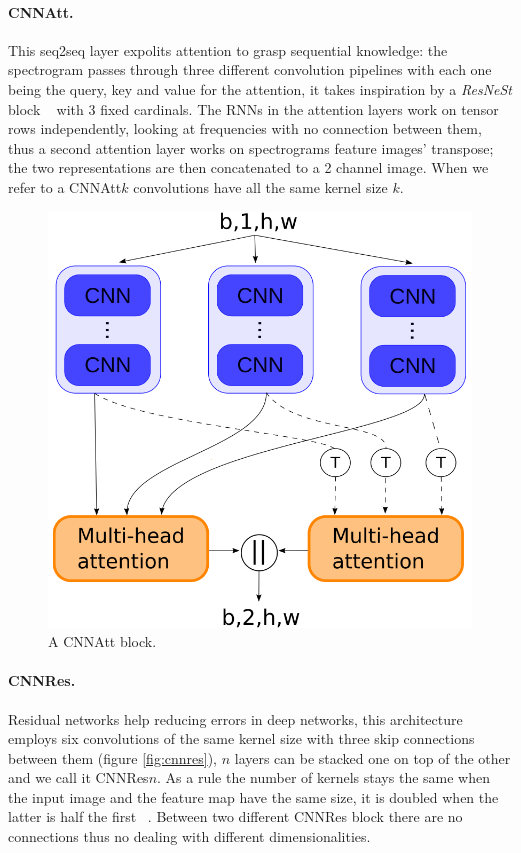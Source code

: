 \documentclass{article}
\begin{document}
\paragraph*{CNNAtt.}
This seq2seq layer expolits attention to grasp sequential knowledge: the spectrogram passes through three different convolution pipelines with each one being the query, key and value for the attention, it takes inspiration by a \textit{ResNeSt} block ~\cite{zhang2020resnest} with 3 fixed cardinals. 
The RNNs in the attention layers work on tensor rows independently, looking at frequencies with no connection between them, thus a second attention layer works on spectrograms feature images' transpose; the two representations are then concatenated to a 2 channel image.
When we refer to a CNNAtt$k$ convolutions have all the same kernel size $k$.

\begin{figure}
    \centering
    \includegraphics[scale=.3]{images/cnn_att.png}
    \caption{A CNNAtt block.}
    \label{fig:cnnatt}
\end{figure}

\paragraph*{CNNRes.}
Residual networks help reducing errors in deep networks, this architecture employs six convolutions of the same kernel size with three skip connections between them (figure \ref{fig:cnnres}), $n$ layers can be stacked one on top of the other and we call it CNNRes$n$.
As a rule the number of kernels stays the same when the input image and the feature map have the same size, it is doubled when the latter is half the first ~\cite{he2016deep}.
Between two different CNNRes block there are no connections thus no dealing with different dimensionalities. 
\end{document}
